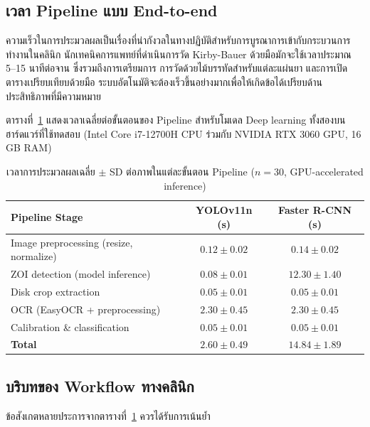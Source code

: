 \subsection{เวลา Pipeline แบบ End-to-end}

ความเร็วในการประมวลผลเป็นเรื่องที่น่ากังวลในทางปฏิบัติสำหรับการบูรณาการเข้ากับกระบวนการทำงานในคลินิก นักเทคนิคการแพทย์ที่ดำเนินการวัด Kirby-Bauer ด้วยมือมักจะใช้เวลาประมาณ 5--15 นาทีต่อจาน \cite{humphries2018} ซึ่งรวมถึงการเตรียมการ การวัดด้วยไม้บรรทัดสำหรับแต่ละแผ่นยา และการเปิดตารางเปรียบเทียบด้วยมือ
ระบบอัตโนมัติจะต้องเร็วขึ้นอย่างมากเพื่อให้เกิดข้อได้เปรียบด้านประสิทธิภาพที่มีความหมาย

ตารางที่~\ref{tab:processing_time} แสดงเวลาเฉลี่ยต่อขั้นตอนของ Pipeline สำหรับโมเดล Deep learning ทั้งสองบนฮาร์ดแวร์ที่ใช้ทดสอบ (Intel Core i7-12700H CPU ร่วมกับ NVIDIA RTX 3060 GPU, 16 GB RAM)

\begin{table}[H]
  \centering
  \caption{เวลาการประมวลผลเฉลี่ย $\pm$ SD ต่อภาพในแต่ละขั้นตอน Pipeline ($n=30$, GPU-accelerated inference)}
  \label{tab:processing_time}
  \begin{tabular}{lcc}
    \toprule
    \textbf{Pipeline Stage} &
    \textbf{YOLOv11n (s)} &
    \textbf{Faster R-CNN (s)} \\
    \midrule
    Image preprocessing (resize, normalize) & $0.12 \pm 0.02$ & $0.14 \pm 0.02$ \\
    ZOI detection (model inference)          & $0.08 \pm 0.01$ & $12.30 \pm 1.40$ \\
    Disk crop extraction                     & $0.05 \pm 0.01$ & $0.05 \pm 0.01$ \\
    OCR (EasyOCR + preprocessing)           & $2.30 \pm 0.45$ & $2.30 \pm 0.45$ \\
    Calibration \& classification            & $0.05 \pm 0.01$ & $0.05 \pm 0.01$ \\
    \midrule
    \textbf{Total}                           & $\mathbf{2.60 \pm 0.49}$ & $\mathbf{14.84 \pm 1.89}$ \\
    \bottomrule
  \end{tabular}
\end{table}

\subsection{บริบทของ Workflow ทางคลินิก}

ข้อสังเกตหลายประการจากตารางที่~\ref{tab:processing_time} ควรได้รับการเน้นย้ำ

